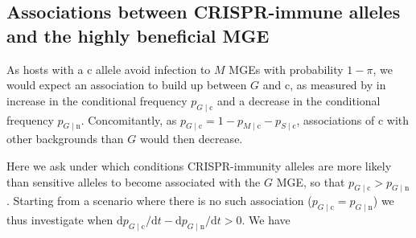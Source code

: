 \documentclass{article}
\newcommand{\badFGE}{M}
\newcommand{\goodFGE}{G}
\newcommand{\sensitive}{\mathrm{n}}
\newcommand{\immune}{\mathrm{c}}
\begin{document}
\subsection{Associations between CRISPR-immune alleles and the highly beneficial MGE}

As hosts with a $\immune$ allele avoid infection to $\badFGE$ MGEs with probability $1-\pi$, we would expect an association to build up between $\goodFGE$ and $\immune$, as measured by in increase in the conditional frequency $p_{\goodFGE\mid \immune}$ and a decrease in the conditional frequency $p_{\goodFGE\mid \sensitive}$. Concomitantly, as $p_{\goodFGE \mid \immune} = 1 - p_{\badFGE \mid \immune} - p_{S \mid \immune}$, associations of $\immune$ with other backgrounds than $\goodFGE$ would then decrease. 

Here we ask under which conditions CRISPR-immunity alleles are more likely than sensitive alleles to become associated with the $\goodFGE$ MGE, so that $p_{\goodFGE\mid \immune}>p_{\goodFGE\mid \sensitive}$. Starting from a scenario where there is no such association ($p_{\goodFGE\mid \immune}=p_{\goodFGE\mid \sensitive}$) we thus investigate when $\mathrm{d} p_{\goodFGE\mid \immune}/ \mathrm{d} t - \mathrm{d} p_{\goodFGE\mid \sensitive}/ \mathrm{d} t> 0$. We have
\end{document}
